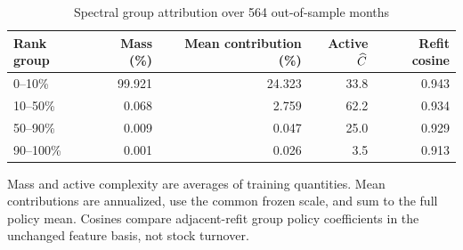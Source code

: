 \begin{table}[htbp]
\centering\small{}
\caption{Spectral group attribution over 564 out-of-sample months}\label{tab:spectrum}
\begin{tabular}{lrrrr}
\toprule
Rank group & Mass (\%) & Mean contribution (\%) & Active $\widehat C$ & Refit cosine \\
\midrule
0--10\% & 99.921 & 24.323 & 33.8 & 0.943 \\
10--50\% & 0.068 & 2.759 & 62.2 & 0.934 \\
50--90\% & 0.009 & 0.047 & 25.0 & 0.929 \\
90--100\% & 0.001 & 0.026 & 3.5 & 0.913 \\
\bottomrule
\end{tabular}
\par\vspace{5pt}
\begin{minipage}{\textwidth}\footnotesize Mass and active complexity are averages of training quantities. Mean contributions are annualized, use the common frozen scale, and sum to the full policy mean. Cosines compare adjacent-refit group policy coefficients in the unchanged feature basis, not stock turnover.\end{minipage}
\end{table}
